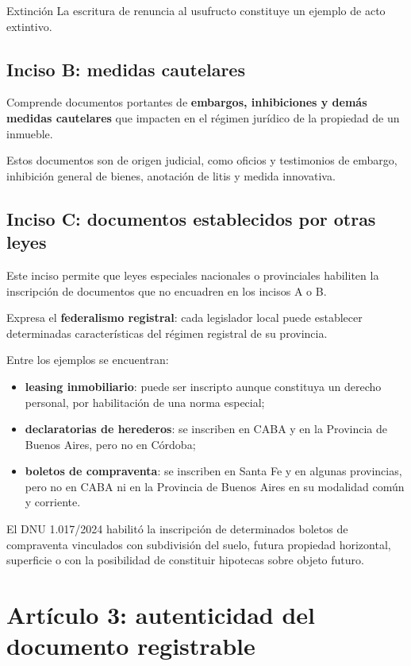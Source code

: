 \documentclass[12pt,oneside]{book}
\begin{document}
\begin{example}{Extinción}
La escritura de renuncia al usufructo constituye un ejemplo de acto extintivo.
\end{example}

\subsection{Inciso B: medidas cautelares}

Comprende documentos portantes de \textbf{embargos, inhibiciones y demás medidas cautelares} que impacten en el régimen jurídico de la propiedad de un inmueble.

Estos documentos son de origen judicial, como oficios y testimonios de embargo, inhibición general de bienes, anotación de litis y medida innovativa.

\subsection{Inciso C: documentos establecidos por otras leyes}

Este inciso permite que leyes especiales nacionales o provinciales habiliten la inscripción de documentos que no encuadren en los incisos A o B.

Expresa el \textbf{federalismo registral}: cada legislador local puede establecer determinadas características del régimen registral de su provincia.

Entre los ejemplos se encuentran:

\begin{itemize}
    \item \textbf{leasing inmobiliario}: puede ser inscripto aunque constituya un derecho personal, por habilitación de una norma especial;
    \item \textbf{declaratorias de herederos}: se inscriben en CABA y en la Provincia de Buenos Aires, pero no en Córdoba;
    \item \textbf{boletos de compraventa}: se inscriben en Santa Fe y en algunas provincias, pero no en CABA ni en la Provincia de Buenos Aires en su modalidad común y corriente.
\end{itemize}

El DNU 1.017/2024 habilitó la inscripción de determinados boletos de compraventa vinculados con subdivisión del suelo, futura propiedad horizontal, superficie o con la posibilidad de constituir hipotecas sobre objeto futuro.

\section{Artículo 3: autenticidad del documento registrable}
\end{document}
